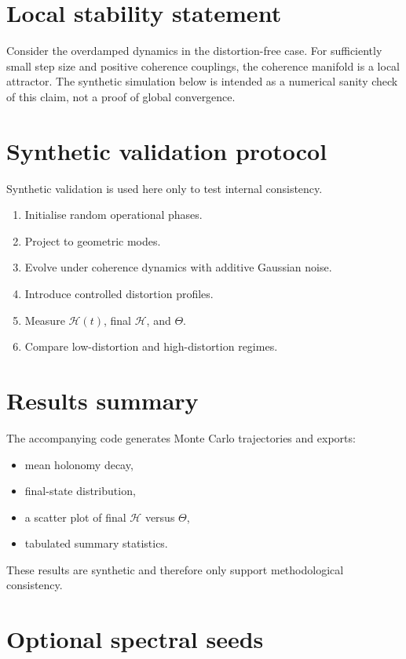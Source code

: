 \documentclass[12pt,a4paper]{article}
\begin{document}
\section{Local stability statement}

Consider the overdamped dynamics in the distortion-free case. For sufficiently small step size and positive coherence couplings, the coherence manifold is a local attractor. The synthetic simulation below is intended as a numerical sanity check of this claim, not a proof of global convergence.

\section{Synthetic validation protocol}

Synthetic validation is used here only to test internal consistency.

\begin{enumerate}
\item Initialise random operational phases.
\item Project to geometric modes.
\item Evolve under coherence dynamics with additive Gaussian noise.
\item Introduce controlled distortion profiles.
\item Measure $\mathcal{H}(t)$, final $\mathcal{H}$, and $\Theta$.
\item Compare low-distortion and high-distortion regimes.
\end{enumerate}

\section{Results summary}

The accompanying code generates Monte Carlo trajectories and exports:
\begin{itemize}
\item mean holonomy decay,
\item final-state distribution,
\item a scatter plot of final $\mathcal{H}$ versus $\Theta$,
\item tabulated summary statistics.
\end{itemize}

These results are synthetic and therefore only support methodological consistency.

\section{Optional spectral seeds}
\end{document}
